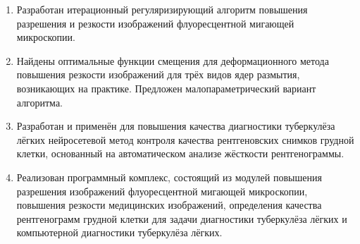 \begin{enumerate}[beginpenalty=10000]
	\item Разработан итерационный регуляризирующий алгоритм повышения разрешения и резкости изображений флуоресцентной мигающей микроскопии.
	
	\item Найдены оптимальные функции смещения для деформационного метода повышения резкости изображений для трёх видов ядер размытия, возникающих на практике. Предложен малопараметрический вариант алгоритма.
	
	\item Разработан и применён для повышения качества диагностики туберкулёза лёгких нейросетевой метод контроля качества рентгеновских снимков грудной клетки, основанный на автоматическом анализе жёсткости рентгенограммы.
	
	\item Реализован программный комплекс, состоящий из модулей повышения разрешения изображений флуоресцентной мигающей микроскопии, повышения резкости медицинских изображений, определения качества рентгенограмм грудной клетки для задачи диагностики туберкулёза лёгких и компьютерной диагностики туберкулёза лёгких.
\end{enumerate}

